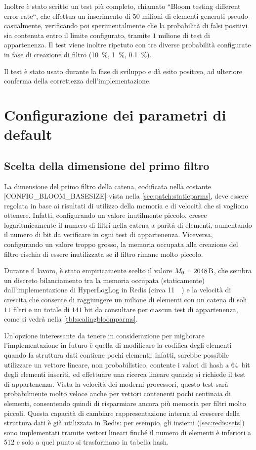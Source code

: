 Inoltre è stato scritto un test più completo, chiamato ``Bloom testing different error rate``,
che effettua un inserimento di $50$ milioni di elementi generati pseudo-casualmente, verificando poi
sperimentalmente che la probabilità di falsi positivi sia contenuta entro il limite configurato,
tramite $1$ milione di test di appartenenza. Il test viene inoltre ripetuto con tre diverse
probabilità configurate in fase di creazione di filtro (\SI{10}{\%}, \SI{1}{\%}, \SI{0.1}{\%}). 

Il test è stato usato durante la fase di sviluppo e dà esito positivo, ad ulteriore conferma della
correttezza dell'implementazione.

\section{Configurazione dei parametri di default}

\subsection{Scelta della dimensione del primo filtro}
\label{sec:patch:basesize}

La dimensione del primo filtro della catena, codificata nella costante \cverb|CONFIG_BLOOM_BASESIZE|
vista nella \autoref{sec:patch:staticparms}, deve essere regolata in base ai risultati di utilizzo
della memoria e di velocità che si vogliono ottenere. Infatti, configurando un valore inutilmente
piccolo, cresce logaritmicamente il numero di filtri nella catena a parità di elementi, aumentando
il numero di bit da verificare in ogni test di appartenenza. Viceversa, configurando un valore
troppo grosso, la memoria occupata alla creazione del filtro rischia di essere inutilizzata se
il filtro rimane molto piccolo.

Durante il lavoro, è stato empiricamente scelto il valore $M_0 = \SI{2048}{\byte}$, che sembra un
discreto bilanciamento tra la memoria occupata (staticamente) dall'implementazione di HyperLogLog in
Redis (circa \SI{11}{\kibi\byte}) e la velocità di crescita che consente di raggiungere un milione
di elementi con un catena di soli $11$ filtri e un totale di $141$ bit da consultare per ciascun
test di appartenenza, come si vedrà nella \autoref{tbl:scalingbloomparms}.

Un'opzione interessante da tenere in considerazione per migliorare l'implementazione in futuro è quella di modificare la
codifica degli elementi quando la struttura dati contiene pochi elementi: infatti, sarebbe possibile
utilizzare un vettore lineare, non probabilistico, contente i valori di hash a \SI{64}{bit} degli
elementi inseriti, ed effettuare una ricerca lineare quando si richiede il test di appartenenza.
Vista la velocità dei moderni processori, questo test sarà probabilmente molto veloce anche per
vettori contenenti pochi centinaia di elementi, consentendo quindi di risparmiare ancora più memoria
per filtri molto piccoli. Questa capacità di cambiare rappresentazione interna al crescere della
struttura dati è già utilizzata in Redis: per esempio, gli insiemi (\autoref{sec:redis:sets})
sono implementati tramite vettori lineari finché il numero di elementi è inferiori a 512 e
solo a quel punto si trasformano in tabella hash.

